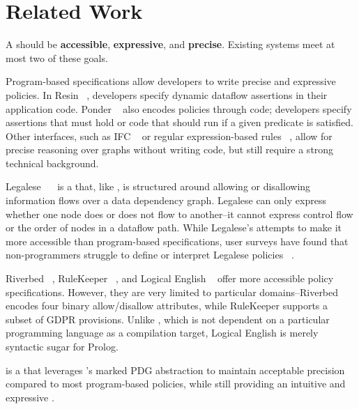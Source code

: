 \section{Related Work}

A \policylang{} should be \textbf{accessible}, \textbf{expressive}, and \textbf{precise}.
%
Existing systems meet at most two of these goals.
%

Program-based specifications allow developers to write precise and expressive policies.
%
In Resin ~\cite{resin}, developers specify dynamic dataflow assertions in their application code.
%
Ponder ~\cite{ponder} also encodes policies through code; developers specify assertions that must hold or code that should run if a given predicate is satisfied.
%
Other interfaces, such as IFC ~\cite{jif} or regular expression-based rules ~\cite{hotnets}, 
allow for precise reasoning over graphs without writing code, but still require a strong technical background.

Legalese ~~\cite{legalese} is a \policylang{} that, like \syslang, is structured around allowing or disallowing information flows over a data dependency graph.
%
Legalese can only express whether one node does or does not flow to another--it cannot express control flow or the order of nodes in a dataflow path.
%
%
While Legalese's  attempts to make it more accessible than program-based specifications, 
user surveys have found that non-programmers struggle to define or interpret Legalese policies ~\cite{legalese, privguard}. 

Riverbed ~\cite{riverbed}, RuleKeeper ~\cite{rulekeeper}, and Logical English ~\cite{logical-english} offer more accessible policy specifications.
%
However, they are very limited to particular domains--Riverbed encodes four binary allow/disallow attributes, while RuleKeeper supports a subset of GDPR provisions.
%
Unlike \syslang, which is not dependent on a particular programming language as a compilation target, Logical English is merely syntactic sugar for Prolog.

\syslang{} is a \policylang{} that leverages \sys{}'s marked PDG abstraction to maintain acceptable precision compared to most program-based policies,
while still providing an intuitive and expressive .